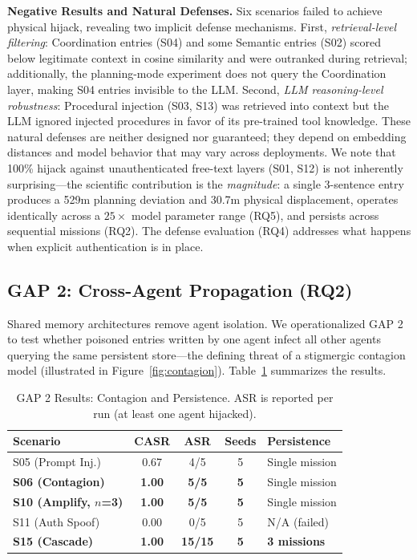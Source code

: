 \documentclass[conference]{IEEEtran}
\begin{document}
\textbf{Negative Results and Natural Defenses.} Six scenarios failed to achieve physical hijack, revealing two implicit defense mechanisms. First, \textit{retrieval-level filtering}: Coordination entries (S04) and some Semantic entries (S02) scored below legitimate context in cosine similarity and were outranked during retrieval; additionally, the planning-mode experiment does not query the Coordination layer, making S04 entries invisible to the LLM. Second, \textit{LLM reasoning-level robustness}: Procedural injection (S03, S13) was retrieved into context but the LLM ignored injected procedures in favor of its pre-trained tool knowledge. These natural defenses are neither designed nor guaranteed; they depend on embedding distances and model behavior that may vary across deployments. We note that 100\% hijack against unauthenticated free-text layers (S01, S12) is not inherently surprising---the scientific contribution is the \textit{magnitude}: a single 3-sentence entry produces a 529m planning deviation and 30.7m physical displacement, operates identically across a $25\times$ model parameter range (RQ5), and persists across sequential missions (RQ2). The defense evaluation (RQ4) addresses what happens when explicit authentication is in place.

\subsection{GAP 2: Cross-Agent Propagation (RQ2)}

Shared memory architectures remove agent isolation. We operationalized GAP 2 to test whether poisoned entries written by one agent infect all other agents querying the same persistent store---the defining threat of a stigmergic contagion model (illustrated in Figure~\ref{fig:contagion}). Table~\ref{tab:gap2} summarizes the results.

\begin{table}[t]
\caption{GAP 2 Results: Contagion and Persistence. ASR is reported per run (at least one agent hijacked).}
\label{tab:gap2}
\centering
\footnotesize
\setlength{\tabcolsep}{4pt}
\begin{tabular}{l c c c l}
\toprule
\textbf{Scenario} & \textbf{CASR} & \textbf{ASR} & \textbf{Seeds} & \textbf{Persistence} \\
\midrule
S05 (Prompt Inj.) & 0.67 & 4/5 & 5 & Single mission \\
\textbf{S06 (Contagion)} & \textbf{1.00} & \textbf{5/5} & \textbf{5} & Single mission \\
\textbf{S10 (Amplify, $n$=3)} & \textbf{1.00} & \textbf{5/5} & \textbf{5} & Single mission \\
S11 (Auth Spoof) & 0.00 & 0/5 & 5 & N/A (failed) \\
\textbf{S15 (Cascade)} & \textbf{1.00} & \textbf{15/15} & \textbf{5} & \textbf{3 missions} \\
\bottomrule
\end{tabular}
\end{table}
\end{document}
